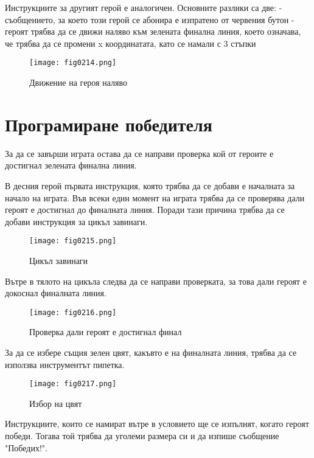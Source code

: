 Инструкциите за другият герой е аналогичен. Основните разлики са две:
- съобщението, за което този герой се абонира е изпратено от червения бутон
- героят трябва да се движи наляво към зелената финална линия, което означава, че трябва да се промени x координатата, като се намали с 3 стъпки

\begin{figure}[H]
  \centering
  \texttt{[image: fig0214.png]}
  \caption{Движение на героя наляво}
\label{fig0214}
\end{figure}

\section{Програмиране победителя}
За да се завърши играта остава да се направи проверка кой от героите е достигнал зелената финална линия.

В десния герой първата инструкция, която трябва да се добави е началната за начало на играта. Във всеки един момент на играта трябва да се проверява дали героят е достигнал до финалната линия. Поради тази причина трябва да се добави инструкция за цикъл завинаги.

\begin{figure}[H]
  \centering
  \texttt{[image: fig0215.png]}
  \caption{Цикъл завинаги}
\label{fig0215}
\end{figure}

Вътре в тялото на цикъла следва да се направи проверката, за това дали героят е докоснал финалната линия.

\begin{figure}[H]
  \centering
  \texttt{[image: fig0216.png]}
  \caption{Проверка дали героят е достигнал финал}
\label{fig0216}
\end{figure}

За да се избере същия зелен цвят, какъвто е на финалната линия, трябва да се използва инструментът пипетка.

\begin{figure}[H]
  \centering
  \texttt{[image: fig0217.png]}
  \caption{Избор на цвят}
\label{fig0217}
\end{figure}

Инструкциите, които се намират вътре в условието ще се изпълнят, когато героят победи. Тогава той трябва да уголеми размера си и да изпише съобщение "Победих!".

